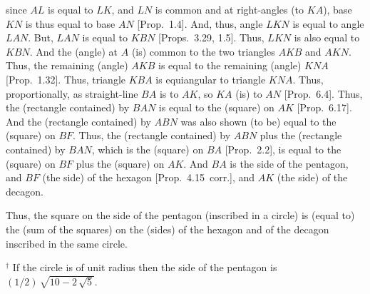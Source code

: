 \begin{Parallel}{}{}
{since $AL$ is equal to $LK$, and $LN$ is common and at right-angles (to $KA$), 
base $KN$ is thus equal to base $AN$  [Prop.~1.4]. And, thus, angle
$LKN$ is equal to angle $LAN$. But, $LAN$ is equal to
$KBN$ [Props.~3.29, 1.5]. Thus, $LKN$ is also equal to $KBN$. 
And the (angle) at $A$ (is) common to the two triangles $AKB$ and
$AKN$. Thus, the remaining (angle) $AKB$ is equal to the
remaining (angle) $KNA$ [Prop.~1.32]. Thus, triangle $KBA$ is
equiangular to triangle $KNA$. Thus, proportionally, as straight-line
$BA$ is to $AK$, so $KA$ (is) to $AN$ [Prop.~6.4]. Thus, the
(rectangle contained) by $BAN$ is equal to the (square) on $AK$ [Prop.~6.17]. 
And  the (rectangle contained) by $ABN$ was also shown (to be)
equal to the (square) on $BF$. Thus, the (rectangle contained) by $ABN$
plus the (rectangle contained) by $BAN$, which is the (square) on $BA$
[Prop.~2.2],
is equal to the (square) on $BF$ plus the (square) on $AK$. 
And $BA$ is the side of the pentagon, and $BF$ (the side) of the hexagon
[Prop.~4.15~corr.], and $AK$ (the side) of the decagon.

Thus, the square on the side of the pentagon  (inscribed in a circle) is (equal to) the (sum of the squares)
on the (sides) of the hexagon and of  the decagon inscribed in the
same circle.}
\end{Parallel}
{\footnotesize\noindent$^\dag$ If the circle is of unit radius then the side
of the pentagon is $(1/2)\,\sqrt{10-2\,\sqrt{5}}$.}

